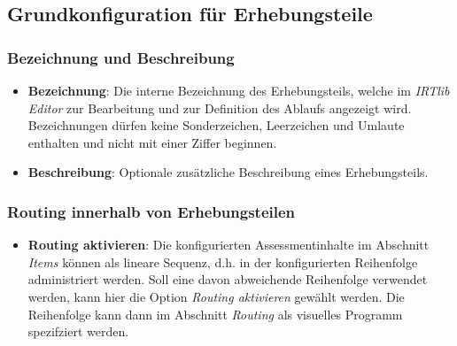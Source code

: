 \documentclass[
  letterpaper,
  DIV=11]{scrreprt}
\providecommand{\tightlist}{%
  \setlength{\itemsep}{0pt}\setlength{\parskip}{0pt}}\usepackage{longtable,booktabs,array}
\begin{document}
\begin{tcolorbox}[enhanced jigsaw, colbacktitle=quarto-callout-tip-color!10!white, coltitle=black, colframe=quarto-callout-tip-color-frame, leftrule=.75mm, breakable, opacitybacktitle=0.6, toprule=.15mm, title=\textcolor{quarto-callout-tip-color}{\faLightbulb}\hspace{0.5em}{Eingebettete Programmhilfe}, colback=white, titlerule=0mm, arc=.35mm, bottomtitle=1mm, toptitle=1mm, rightrule=.15mm, bottomrule=.15mm, left=2mm, opacityback=0]

\hypertarget{grundkonfiguration-fuxfcr-erhebungsteile-1}{%
\subsection{Grundkonfiguration für
Erhebungsteile}\label{grundkonfiguration-fuxfcr-erhebungsteile-1}}

\hypertarget{bezeichnung-und-beschreibung-1}{%
\subsubsection{Bezeichnung und
Beschreibung}\label{bezeichnung-und-beschreibung-1}}

\begin{itemize}
\item
  \textbf{Bezeichnung}: Die interne Bezeichnung des Erhebungsteils,
  welche im \emph{IRTlib Editor} zur Bearbeitung und zur Definition des
  Ablaufs angezeigt wird. Bezeichnungen dürfen keine Sonderzeichen,
  Leerzeichen und Umlaute enthalten und nicht mit einer Ziffer beginnen.
\item
  \textbf{Beschreibung}: Optionale zusätzliche Beschreibung eines
  Erhebungsteils.
\end{itemize}

\hypertarget{routing-innerhalb-von-erhebungsteilen-2}{%
\subsubsection{Routing innerhalb von
Erhebungsteilen}\label{routing-innerhalb-von-erhebungsteilen-2}}

\begin{itemize}
\tightlist
\item
  \textbf{Routing aktivieren}: Die konfigurierten Assessmentinhalte im
  Abschnitt \emph{Items} können als lineare Sequenz, d.h. in der
  konfigurierten Reihenfolge administriert werden. Soll eine davon
  abweichende Reihenfolge verwendet werden, kann hier die Option
  \emph{Routing aktivieren} gewählt werden. Die Reihenfolge kann dann im
  Abschnitt \emph{Routing} als visuelles Programm spezifziert werden.
\end{itemize}


\end{tcolorbox}
\end{document}
